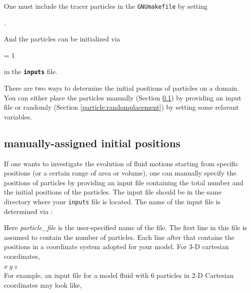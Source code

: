 One must include the tracer particles in the {\tt GNUmakefile} by setting

\vspace{0.1in}
.
\vspace{0.1in}

\noindent And the particles can be initialized via

\vspace{0.1in}
     = 1
\vspace{0.1in}

\noindent in the {\tt {\bf inputs}} file.

\vspace{0.1in}
\noindent There are two ways to determine the initial positions of particles on a domain. You can either place the particles manually (Section \ref{particle:manualplacement}) by providing an input file or randomly (Section \ref{particle:randomplacement}) by setting some relavant variables.

\subsection{manually-assigned initial positions}
	\label{particle:manualplacement}
If one wants to investigate the evolution of fluid motions starting from specific positions (or a certain range of area or volume), one can manually specify the positions of particles by providing an input file containing the total number and the initial positions of the particles.  
The input file should be in the same directory where your {\tt inputs} file is located. The name of the input file is  determined via :

\vspace{0.1in}
\vspace{0.1in}

\noindent Here {\em particle\_file} is the user-specified name of the file. The first line in this file is
assumed to contain the number of particles.  Each line after that contains the positions in a coordinate system adopted for your model. For 3-D cartesian coordinates, \\

$x ~y ~z$ \\

For example, an input file for a model fluid with 6 particles in 2-D Cartesian coordinates may look like,\\

